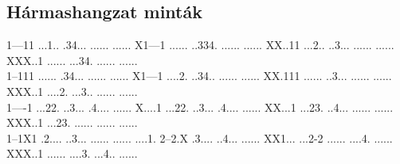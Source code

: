 

\pagestyle{empty}

\vspace*{\fill}
\subsection*{Hármashangzat minták}
           {1---11%
            ...1..%
            .34...%
            ......%
            ......} 
           {X1---1%
            ......%
            ..334.%
            ......%
            ......} 
           {XX..11%
            ...2..%
            ..3...%
            ......%
            ......} 
           {XXX..1%
            ......%
            ...34.%
            ......%
            ......}\\
           {1--111%
            ......%
            .34...%
            ......%
            ......} 
           {X1---1%
            ....2.%
            ..34..%
            ......%
            ......} 
           {XX.111%
            ......%
            ..3...%
            ......%
            ......} 
           {XXX..1%
            ....2.%
            ...3..%
            ......%
            ......}\\
           {1----1%
            ...22.%
            ..3...%
            .4....%
            ......} 
           {X....1%
            ...22.%
            ..3...%
            .4....%
            ......} 
           {XX...1%
            ...23.%
            ..4...%
            ......%
            ......} 
           {XXX..1%
            ...23.%
            ......%
            ......%
            ......}\\
           {1--1X1%
            .2....%
            ..3...%
            ......%
            ......} 
           {....1.%
            2--2.X%
            .3....%
            ..4...%
            ......} 
           {XX1...%
            ...2-2%
            ......%
            ....4.%
            ......} 
           {XXX..1%
            ......%
            ....3.%
            ...4..%
            ......}
\vspace*{\fill}

